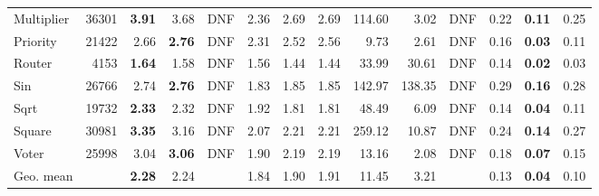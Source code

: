 \begin{tabular}{l r rrrrrr rrrrrr}
Multiplier & 36301 & \textbf{3.91} & 3.68 & DNF & 2.36 & 2.69 & 2.69 & 114.60 & 3.02 & DNF & 0.22 & \textbf{0.11} & 0.25 \\
Priority & 21422 & 2.66 & \textbf{2.76} & DNF & 2.31 & 2.52 & 2.56 & 9.73 & 2.61 & DNF & 0.16 & \textbf{0.03} & 0.11 \\
Router & 4153 & \textbf{1.64} & 1.58 & DNF & 1.56 & 1.44 & 1.44 & 33.99 & 30.61 & DNF & 0.14 & \textbf{0.02} & 0.03 \\
Sin & 26766 & 2.74 & \textbf{2.76} & DNF & 1.83 & 1.85 & 1.85 & 142.97 & 138.35 & DNF & 0.29 & \textbf{0.16} & 0.28 \\
Sqrt & 19732 & \textbf{2.33} & 2.32 & DNF & 1.92 & 1.81 & 1.81 & 48.49 & 6.09 & DNF & 0.14 & \textbf{0.04} & 0.11 \\
Square & 30981 & \textbf{3.35} & 3.16 & DNF & 2.07 & 2.21 & 2.21 & 259.12 & 10.87 & DNF & 0.24 & \textbf{0.14} & 0.27 \\
Voter & 25998 & 3.04 & \textbf{3.06} & DNF & 1.90 & 2.19 & 2.19 & 13.16 & 2.08 & DNF & 0.18 & \textbf{0.07} & 0.15 \\
\midrule
Geo. mean &  & \textbf{2.28} & 2.24 &  & 1.84 & 1.90 & 1.91 & 11.45 & 3.21 &  & 0.13 & \textbf{0.04} & 0.10 \\
\bottomrule
\end{tabular}
